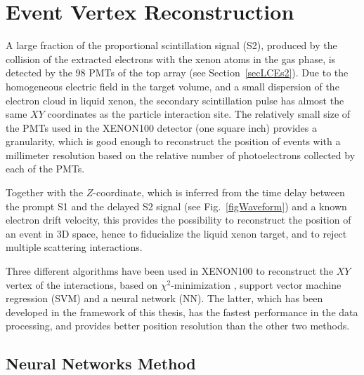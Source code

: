 \chapter{Event Vertex Reconstruction}
\label{chPositionReconstruction}


A large fraction of the proportional scintillation signal (S2), produced by the collision of the extracted electrons with the xenon atoms in the gas phase, is detected by the 98 PMTs of the top array (see Section~\ref{secLCEs2}). Due to the homogeneous electric field in the target volume, and a small dispersion of the electron cloud in liquid xenon, the secondary scintillation pulse has almost the same $XY$ coordinates as the particle interaction site. The relatively small size of the PMTs used in the XENON100 detector (one square inch) provides a granularity, which is good enough to reconstruct the position of events with a millimeter resolution based on the relative number of photoelectrons collected by each of the PMTs.

Together with the $Z$-coordinate, which is inferred from the time delay between the prompt S1 and the delayed S2 signal (see Fig.~\ref{figWaveform}) and a known electron drift velocity, this provides the possibility to reconstruct the position of an event in 3D space, hence to fiducialize the liquid xenon target, and to reject multiple scattering interactions.

Three different algorithms have been used in XENON100 to reconstruct the $XY$ vertex of the interactions, based on $\chi^{2}$-minimization \cite{Yuan}, support vector machine regression (SVM) \cite{Antonio} and a  neural network (NN). The latter, which has been developed in the framework of this thesis, has the fastest performance in the data processing, and provides better position resolution than the other two methods.


\section{Neural Networks Method}
\label{secNN}

